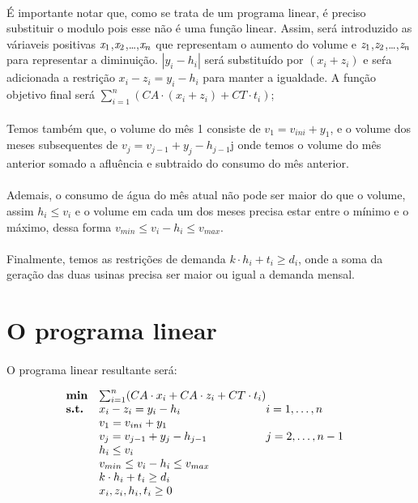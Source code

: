 \documentclass{article}
\begin{document}
\paragraph{} É importante notar que, como se trata de um programa linear, é preciso substituir o modulo pois esse não é uma função linear. Assim, será introduzido as váriaveis positivas $\emph{x}_1$,$\emph{x}_2$,\dots,$\emph{x}_n$ que representam o aumento do volume e $\emph{z}_1$,$\emph{z}_2$,\dots,$\emph{z}_n$ para representar a diminuição. \emph{$| y_{i} - h_{i} |$} será substituído por \emph{$(x_i + z_i)$} e seŕa adicionada a restrição \emph{$x_i - z_i = y_i - h_i$} para manter a igualdade. A função objetivo final será \emph{$\sum_{i=1}^{n} (CA \cdot (x_i + z_i) + CT \cdot t_{i})$};
\paragraph{} Temos também que, o volume do mês 1 consiste de \emph{$v_1 = v_{ini} + y_1$}, e o volume dos meses subsequentes de \emph{$v_j = v_{j-1} + y_j - h_{j-1}$}j onde temos o volume do mês anterior somado a afluência e subtraido do consumo do mês anterior. 
\paragraph{} Ademais, o consumo de água do mês atual não pode ser maior do que o volume, assim \emph{$h_i \le v_i$} e o volume em cada um dos meses precisa estar entre o mínimo e o máximo, dessa forma \emph{$v_{min} \le v_i - h_i \le v_{max}$}.
\paragraph{} Finalmente, temos as restrições de demanda \emph{$k \cdot h_i + t_i \ge d_i $}, onde a soma da geração das duas usinas precisa ser maior ou igual a demanda mensal.

\section{O programa linear}
\paragraph{} O programa linear resultante será:

\begin{equation*}
    \begin{array}{ll@{}ll}
        \textbf{min}  & \sum_{i=1}^{n} (CA \cdot x_i + CA \cdot z_i + CT \cdot t_{i}) &\\
        \textbf{s.t.} & x_i - z_i = y_i - h_i &i=1 ,\dots, n\\
                      & v_1 = v_{ini} + y_1 &\\ 
                      & v_j = v_{j-1} + y_j - h_{j-1} &j=2 ,\dots, n-1&\\
                      & h_i \le v_i &\\
                      & v_{min} \le v_i - h_i \le v_{max} &\\
                      & k \cdot h_i + t_i \ge d_i &\\
                      & x_i,z_i,h_i,t_i \ge 0
    \end{array}
\end{equation*}
\end{document}

